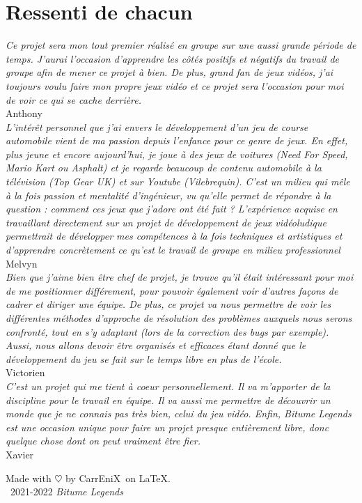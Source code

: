 \documentclass[12pt,a4paper]{article}
\newcommand{\btmlgs}{\textit{Bitume Legends}}
\newcommand{\CEX}{CarrEniX}
\begin{document}
\section{Ressenti de chacun}
  \indent\textit{Ce projet sera mon tout premier réalisé en groupe sur une aussi 
  grande période de temps. J'aurai l'occasion d'apprendre les côtés positifs et 
  négatifs du travail de groupe afin de mener ce projet à bien. De plus, grand
  fan de jeux vidéos, j'ai toujours voulu faire mon propre jeux vidéo et ce 
  projet sera l'occasion pour moi de voir ce qui se cache derrière.} \\
  \indent Anthony\\[0.3cm]
  \indent\textit{L'intérêt personnel que j'ai envers le développement d'un jeu 
  de course automobile vient de ma passion depuis l'enfance pour ce genre de 
  jeux. En effet, plus jeune et encore aujourd'hui, je joue à des jeux de 
  voitures (Need For Speed, Mario Kart ou Asphalt) et je regarde beaucoup 
  de contenu automobile à la télévision (Top Gear UK) et sur Youtube 
  (Vilebrequin). C'est un milieu qui mêle à la fois passion et mentalité 
  d'ingénieur, vu qu'elle permet de répondre à la question : comment ces 
  jeux que j'adore ont été fait ? L'expérience acquise en travaillant 
  directement sur un projet de développement de jeux vidéoludique 
  permettrait de développer mes compétences à la fois techniques et 
  artistiques et d'apprendre concrètement ce qu'est le travail de groupe en 
  milieu professionnel} \\
  \indent Melvyn\\[0.3cm]
  \indent\textit{Bien que j'aime bien être chef de projet, je trouve qu'il était 
  intéressant pour moi de me positionner différement, pour pouvoir également voir 
  d'autres façons de cadrer et diriger une équipe. De plus, ce projet va nous
  permettre de voir les différentes méthodes d'approche de résolution des 
  problèmes auxquels nous serons confronté, tout en s'y adaptant (lors de la 
  correction des bugs par exemple). Aussi, nous allons devoir être organisés
  et efficaces étant donné que le développement du jeu se fait sur le temps 
  libre en plus de l'école.} \\
  \indent Victorien\\[0.3cm]
  \indent\textit{C'est un projet qui me tient à coeur personnellement. Il 
  va m'apporter de la discipline pour le travail en équipe. Il va aussi me 
  permettre de découvrir un monde que je ne connais pas très bien, celui du 
  jeu vidéo. Enfin, Bitume Legends est une occasion unique pour faire un projet 
  presque entièrement libre, donc quelque chose dont on peut vraiment être fier.} \\
  \indent Xavier

\begin{thebibliography}{9}
  
\end{thebibliography}
  
\begin{center}
  Made with $\heartsuit$ by \CEX\, on \LaTeX.\\
  \textcopyright\, 2021-2022 \btmlgs
\end{center}
\clearpage
\end{document}

